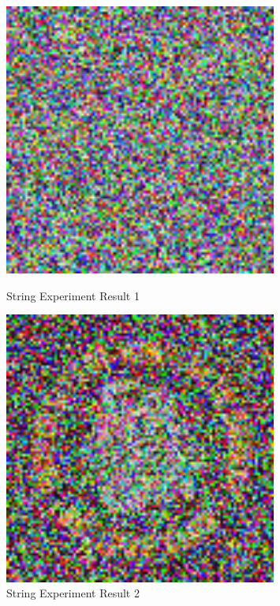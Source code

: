 \documentclass{article}
\begin{document}
\begin{figure}[ht]
    \centering
    \begin{minipage}{0.45\textwidth}
        \centering
        \includegraphics[width=0.8\textwidth]{bulldog000001} %
        \caption{String Experiment Result 1}
    \end{minipage}\hfill
    \begin{minipage}{0.45\textwidth}
        \centering
        \includegraphics[width=0.8\textwidth]{bulldog000003} %
        \caption{String Experiment Result 2}
    \end{minipage}
\end{figure}
\end{document}

